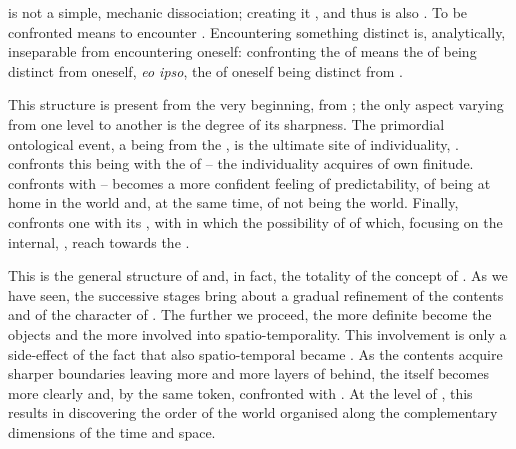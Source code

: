 \pa {} is not a simple, mechanic dissociation; creating
 it , and thus is also .  To be
confronted means to encounter .  Encountering something
distinct is, analytically, inseparable from encountering oneself: confronting
the  of  means the  of  being
distinct from oneself, {\em eo ipso}, the  of oneself being
distinct from .

This structure is present from the very beginning, from ; 
%
the only aspect varying from one level to another is the degree of its
sharpness. The primordial ontological event,  a being from the
, is the ultimate site of individuality, .
 confronts this being with the  of 
-- the individuality acquires  of own finitude.
 confronts  with  --
 becomes a more confident feeling of predictability, of being
at home in the world and, at the same time, of not being the world. Finally,
 confronts one with its , with  in
which   the possibility of 
of  which, focusing on the internal, ,
reach towards the  .

This is the general structure of  and, in fact, the totality
of the concept of . 
% 
%
As we have seen, the successive stages bring about a gradual refinement of the
 contents and of the character of . The further
we proceed, the more definite become the objects and the more involved into
spatio-temporality. This involvement is only a side-effect of the fact that also
spatio-temporal  became .  As the
 contents acquire sharper boundaries leaving more and more
layers of  behind, the  itself becomes more
clearly  and, by the same token, confronted with
 .  At the level of ,
this results in discovering the  order of the world organised
along the complementary dimensions of the  time and space.

